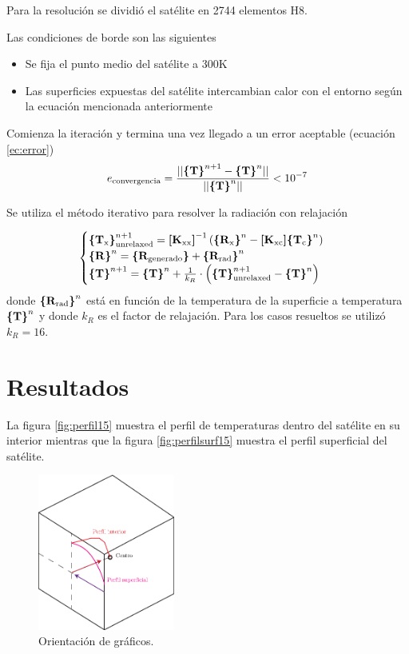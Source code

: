 \documentclass[onecolumn,10pt,titlepage,a4paper]{article}
\begin{document}
Para la resolución se dividió el satélite en 2744 elementos H8.

Las condiciones de borde son las siguientes
\begin{itemize}
	\item Se fija el punto medio del satélite a 300K
	\item Las superficies expuestas del satélite intercambian calor con el entorno según la ecuación mencionada anteriormente
\end{itemize}

Comienza la iteración  y termina una vez llegado a un error aceptable (ecuación \ref{ec:error})
\begin{equation}\label{ec:error}
	e_{\mathrm{convergencia}}=\frac{||\boldsymbol{\{ }\mathbf{T} \boldsymbol{\}}^{n+1}-\boldsymbol{\{ }\mathbf{T} \boldsymbol{\}}^{n}||}{||\boldsymbol{\{ }\mathbf{T} \boldsymbol{\}}^{n}||} < 10^{-7}
\end{equation}

Se utiliza el método iterativo para resolver la radiación con relajación

\begin{equation}
\begin{cases}
	\boldsymbol{\{ }\mathbf{T_{\mathrm{x}}} \boldsymbol{\}}^{n+1}_{\mathrm{unrelaxed}} =  \boldsymbol{[}\mathbf{K_{\mathrm{xx}}} \boldsymbol{]} ^{-1}  \left(\boldsymbol{\{ }\mathbf{R_{\mathrm{x}}} \boldsymbol{\}}^{n} - \boldsymbol{[}\mathbf{K_{\mathrm{xc}}} \boldsymbol{]} \boldsymbol{\{ }\mathbf{T_{\mathrm{c}}} \boldsymbol{\}}^{n}\right)\\
	\boldsymbol{\{ }\mathbf{R} \boldsymbol{\}}^{n} = \boldsymbol{\{ }\mathbf{R_{\mathrm{generado}}} \boldsymbol{\}}+ \boldsymbol{\{ }\mathbf{R_{\mathrm{rad}}} \boldsymbol{\}}^{n} \\
	\boldsymbol{\{ }\mathbf{T} \boldsymbol{\}}^{n+1} = \boldsymbol{\{ }\mathbf{T} \boldsymbol{\}}^n + \frac{1}{k_R} \cdot \left( \boldsymbol{\{ }\mathbf{T} \boldsymbol{\}}^{n+1}_{\mathrm{unrelaxed}} - \boldsymbol{\{ }\mathbf{T} \boldsymbol{\}}^{n} \right)
\end{cases}
\end{equation}
donde $\boldsymbol{\{ }\mathbf{R_{\mathrm{rad}}} \boldsymbol{\}}^{n}$ está en función de la temperatura de la superficie a temperatura $\boldsymbol{\{ }\mathbf{T} \boldsymbol{\}}^{n}$ y donde $k_R$ es el factor de relajación. Para los casos resueltos se utilizó $k_R=16$.

\section*{Resultados}
La figura \ref{fig:perfil15} muestra el perfil de temperaturas dentro del satélite en su interior mientras que la figura \ref{fig:perfilsurf15} muestra el perfil superficial del satélite. 
\begin{figure}[htb!]
	\centering
	\includegraphics[width=0.4\textwidth]{fig/modelo.eps}
	\caption{Orientación de gráficos.}
	\label{fig:modelo}
\end{figure}
\end{document}
